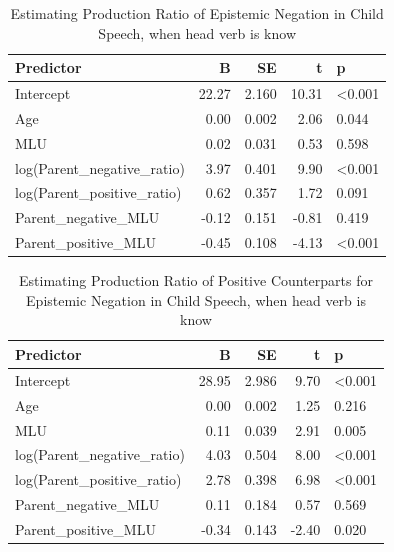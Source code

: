 \documentclass[
  english,
  man,floatsintext]{apa6}
\begin{document}
\clearpage

\begin{table}

\caption{\label{tab:unnamed-chunk-7}Estimating Production Ratio of Epistemic Negation in Child Speech, when head verb is know}
\centering
\begin{tabular}[t]{l|r|r|r|l}
\hline
Predictor & B & SE & t & p\\
\hline
Intercept & 22.27 & 2.160 & 10.31 & <0.001\\
\hline
Age & 0.00 & 0.002 & 2.06 & 0.044\\
\hline
MLU & 0.02 & 0.031 & 0.53 & 0.598\\
\hline
log(Parent\_negative\_ratio) & 3.97 & 0.401 & 9.90 & <0.001\\
\hline
log(Parent\_positive\_ratio) & 0.62 & 0.357 & 1.72 & 0.091\\
\hline
Parent\_negative\_MLU & -0.12 & 0.151 & -0.81 & 0.419\\
\hline
Parent\_positive\_MLU & -0.45 & 0.108 & -4.13 & <0.001\\
\hline
\end{tabular}
\end{table}

\begin{table}

\caption{\label{tab:unnamed-chunk-7}Estimating Production Ratio of Positive Counterparts for Epistemic Negation in Child Speech, when head verb is know}
\centering
\begin{tabular}[t]{l|r|r|r|l}
\hline
Predictor & B & SE & t & p\\
\hline
Intercept & 28.95 & 2.986 & 9.70 & <0.001\\
\hline
Age & 0.00 & 0.002 & 1.25 & 0.216\\
\hline
MLU & 0.11 & 0.039 & 2.91 & 0.005\\
\hline
log(Parent\_negative\_ratio) & 4.03 & 0.504 & 8.00 & <0.001\\
\hline
log(Parent\_positive\_ratio) & 2.78 & 0.398 & 6.98 & <0.001\\
\hline
Parent\_negative\_MLU & 0.11 & 0.184 & 0.57 & 0.569\\
\hline
Parent\_positive\_MLU & -0.34 & 0.143 & -2.40 & 0.020\\
\hline
\end{tabular}
\end{table}

\clearpage
\end{document}
